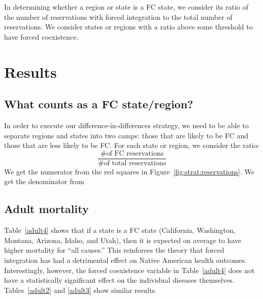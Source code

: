 \documentclass[12pt]{article}
\begin{document}
In determining whether a region or state is a FC state, we consider its ratio of the number of reservations with forced integration to the total number of reservations.
We consider states or regions with a ratio above some threshold to have forced coexistence.





\section{Results}

\subsection{What counts as a FC state/region?}
In order to execute our difference-in-differences strategy, we need to be able to separate regions and states into two camps: those that are likely to be FC and those that are less likely to be FC. For each state or region, we consider the ratio:
$$\frac{\mbox{\# of FC reservations}}{\mbox{\# of total reservations}}$$
We get the numerator from the red squares in Figure~\ref{fig:strat:reservations}.
We get the denominator from %


\subsection{Adult mortality}
Table~\ref{adult4} shows that if a state is a FC state (California, Washington, Montana, Arizona, Idaho, and Utah), then it is expected on average to have higher mortality for ``all causes.'' 
This reinforces the theory that forced integration has had a detrimental effect on Native American health outcomes. 
Interestingly, however, the forced coexistence variable in Table~\ref{adult4} does not have a statistically significant effect on the individual diseases themselves. 
Tables~\ref{adult2} and \ref{adult3} show similar results.
\end{document}
